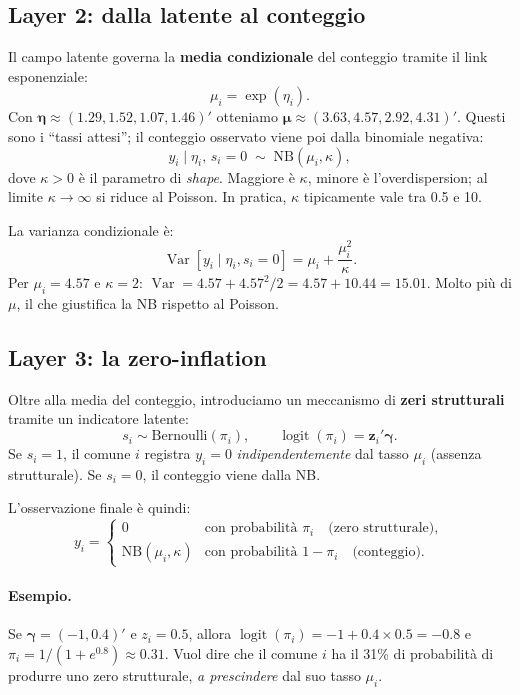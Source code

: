 \documentclass[12pt,a4paper]{article}
\DeclareMathOperator{\Var}{Var}
\DeclareMathOperator{\logit}{logit}
\begin{document}
\subsection{Layer 2: dalla latente al conteggio}

Il campo latente governa la \textbf{media condizionale} del conteggio tramite il link esponenziale:
\begin{equation}\label{eq:mean}
  \mu_i = \exp(\eta_i).
\end{equation}
Con $\boldsymbol{\eta} \approx (1.29, 1.52, 1.07, 1.46)'$ otteniamo $\boldsymbol{\mu} \approx (3.63, 4.57, 2.92, 4.31)'$.
Questi sono i ``tassi attesi''; il conteggio osservato viene poi dalla binomiale negativa:
\[
  y_i \mid \eta_i,\, s_i = 0 \;\sim\; \mathrm{NB}(\mu_i, \kappa),
\]
dove $\kappa > 0$ \`e il parametro di \emph{shape}. Maggiore \`e $\kappa$, minore \`e l'overdispersion; al limite $\kappa \to \infty$ si riduce al Poisson. In pratica, $\kappa$ tipicamente vale tra 0.5 e 10.

La varianza condizionale \`e:
\[
  \Var[y_i \mid \eta_i, s_i=0] = \mu_i + \frac{\mu_i^2}{\kappa}.
\]
Per $\mu_i = 4.57$ e $\kappa = 2$: $\Var = 4.57 + 4.57^2/2 = 4.57 + 10.44 = 15.01$. Molto pi\`u di $\mu$, il che giustifica la NB rispetto al Poisson.

\subsection{Layer 3: la zero-inflation}

Oltre alla media del conteggio, introduciamo un meccanismo di \textbf{zeri strutturali} tramite un indicatore latente:
\[
  s_i \sim \text{Bernoulli}(\pi_i), \qquad \logit(\pi_i) = \mathbf{z}_i'\boldsymbol{\gamma}.
\]
Se $s_i = 1$, il comune $i$ registra $y_i = 0$ \emph{indipendentemente} dal tasso $\mu_i$ (assenza strutturale). Se $s_i = 0$, il conteggio viene dalla NB.

L'osservazione finale \`e quindi:
\[
  y_i = \begin{cases}
    0 & \text{con probabilit\`a } \pi_i \quad \text{(zero strutturale)}, \\
    \text{NB}(\mu_i, \kappa) & \text{con probabilit\`a } 1 - \pi_i \quad \text{(conteggio)}.
  \end{cases}
\]

\paragraph{Esempio.}
Se $\boldsymbol{\gamma} = (-1, 0.4)'$ e $z_i = 0.5$, allora $\logit(\pi_i) = -1 + 0.4 \times 0.5 = -0.8$ e $\pi_i = 1/(1+e^{0.8}) \approx 0.31$.
Vuol dire che il comune $i$ ha il 31\% di probabilit\`a di produrre uno zero strutturale, \emph{a prescindere} dal suo tasso $\mu_i$.
\end{document}
